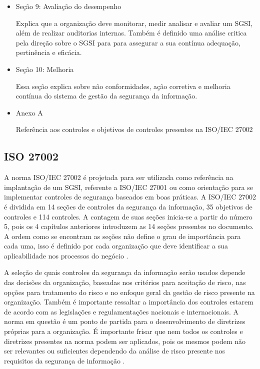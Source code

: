 \begin{itemize}
\item Seção 9: Avaliação do desempenho

    Explica que a organização deve monitorar, medir analisar e avaliar um SGSI, além de realizar auditorias internas. Também é definido uma análise critica pela direção sobre o SGSI para  para assegurar a sua contínua adequação, pertinência e eficácia. 

\item Seção 10: Melhoria
   
    Essa seção explica sobre não conformidades, ação corretiva e melhoria contínua do sistema de gestão
da segurança da informação.

\item Anexo A
   
    Referência aos controles e objetivos de controles presentes na ISO/IEC 27002

 \end{itemize}


\subsection{ISO 27002}

A norma ISO/IEC 27002 é projetada para ser utilizada como referência na implantação de um SGSI, referente a ISO/IEC 27001 ou como orientação para se implementar controles de segurança baseados em boas práticas. A ISO/IEC 27002 é dividida em 14 seções de controles da segurança da informação, 35 objetivos de controles e 114 controles. A contagem de suas seções inicia-se a partir do número 5, pois os 4 capítulos anteriores introduzem as 14 seções presentes no documento. A ordem como se encontram as seções não define o grau de importância para cada uma, isso é definido por cada organização que deve identificar a sua aplicabilidade nos processos do negócio \cite{ISO27002}.


A seleção de quais controles da segurança da informação serão usados depende das decisões da organização, baseadas nos critérios para aceitação de risco, nas opções para tratamento do risco e no enfoque geral da gestão de risco presente na organização. Também é importante ressaltar a importância dos controles estarem de acordo com as legislações e regulamentações nacionais e internacionais. A norma em questão é um ponto de partida para o desenvolvimento de diretrizes próprias para a organização. É importante frisar que nem todos os controles e diretrizes presentes na norma podem ser aplicados, pois os mesmos podem não ser relevantes ou suficientes dependendo da análise de risco presente nos requisitos da segurança de informação \cite{ISO27002}. 

